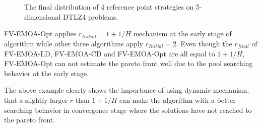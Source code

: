 \documentclass[conference]{IEEEtran}
\begin{document}
\begin{figure}[!t]
  \centering
  \quad
  \\
  \quad
  \\
  \caption{
    The final distribution of 4 reference point strategies on 5-dimensional DTLZ4 problems.
  }
  \label{iudm3}
\end{figure} 
FV-EMOA-Opt applies $r_{Initial} = 1+1/H$ mechanism at the early stage of algorithm 
while other three algorithms apply $r_{Initial} = 2$.
Even though the $r_{final}$ of FV-EMOA-LD, FV-EMOA-CD and FV-EMOA-Opt are all equal to $1+1/H$, 
FV-EMOA-Opt can not estimate the pareto front well due to the pool searching behavior at the early stage.

The above example clearly shows the importance of using dynamic mechanism, 
that a slightly larger $r$ than $1+1/H$ can make the algorithm with a better searching behavior in 
convergence stage where the solutions have not reached to the pareto front. 
\end{document}
